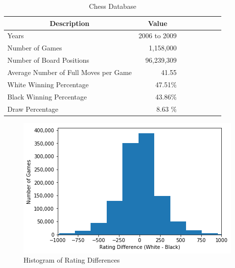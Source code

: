 \documentclass[12pt]{article}
\begin{document}
\begin{table}[h]
	\centering
	\caption{Chess Database} \label{t2}
	\begin{tabular}{l r r r r r r r}
		\multicolumn{1}{c}{Description} & \multicolumn{1}{c}{Value} \\ \hline
		Years & 2006 to 2009 \\
		Number of Games & 1,158,000 \\
		Number of Board Positions & 96,239,309 \\
		Average Number of Full Moves per Game & 41.55 \\
		White Winning Percentage & 47.51\% \\
		Black Winning Percentage & 43.86\% \\
		Draw Percentage & 8.63 \% \\
		\hline
	\end{tabular}
\end{table}

\begin{figure}[h!]
	\centering
	\caption{Histogram of Rating Differences}
	\includegraphics[scale=0.75]{ratinghist}
\end{figure}


\end{document}
